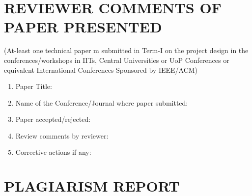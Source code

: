 \begin{appendices}
	\chapter[Reviewer comments of paper presented]{REVIEWER COMMENTS OF PAPER PRESENTED}
		(At-least one technical paper m submitted in Term-I on the project design in the conferences/workshops in IITs, Central Universities or UoP Conferences or equivalent International Conferences Sponsored by IEEE/ACM)

		\begin{enumerate}
			\item Paper Title:
			\vspace{1cm}
			\item Name of the Conference/Journal where paper submitted:
			\vspace{1cm}
			\item Paper accepted/rejected: 
			\vspace{1cm}
			\item Review comments by reviewer:
			\vspace{1cm}
			\item Corrective actions if any:
		\end{enumerate}
	
	\chapter[Plagiarism Report]{PLAGIARISM REPORT}
		\begin{figure}[h!]
			\centering
		\end{figure}
\end{appendices}